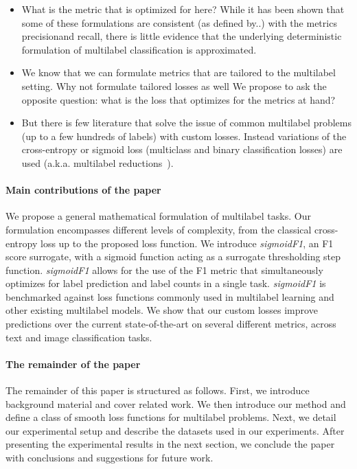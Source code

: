 \begin{itemize}[leftmargin=*,nosep]
\item{What is the metric that is optimized for here? While it has been shown that some of these formulations are consistent (as defined by..) with the metrics precision\@K and recall\@K, there is little evidence that the underlying deterministic formulation of multilabel classification is approximated.}
\item{We know that we can formulate metrics that are tailored to the multilabel setting. Why not formulate tailored losses as well
We propose to ask the opposite question: what is the loss that optimizes for the metrics at hand?}
\item{But there is few literature that solve the issue of common multilabel problems (up to a few hundreds of labels) with custom losses. Instead variations of the cross-entropy or sigmoid loss (multiclass and binary classification losses) are used (a.k.a. multilabel reductions~\cite{multilabelReduction}).}
\end{itemize}
\fi

\paragraph{Main contributions of the paper}
We propose a general mathematical formulation of multilabel tasks.
Our formulation encompasses different levels of complexity, from the classical cross-entropy loss up to the proposed loss function. We introduce \emph{sigmoidF1}, an F1 score surrogate, with a sigmoid function acting as a surrogate thresholding step function.
\emph{sigmoidF1} allows for the use of the F1 metric that simultaneously optimizes for label prediction and label counts in a single task.
\emph{sigmoidF1} is benchmarked against loss functions commonly used in multilabel learning and other existing multilabel models. We show that our custom losses improve predictions over the current state-of-the-art on several different metrics, across text and image classification tasks.

\paragraph{The remainder of the paper}
The remainder of this paper is structured as follows. First, we introduce background material and cover related work. We then introduce our method and define a class of smooth loss functions for multilabel problems. Next, we detail our experimental setup and describe the datasets used in our experiments. After presenting the experimental results in the next section, we conclude the paper with conclusions and suggestions for future work.





